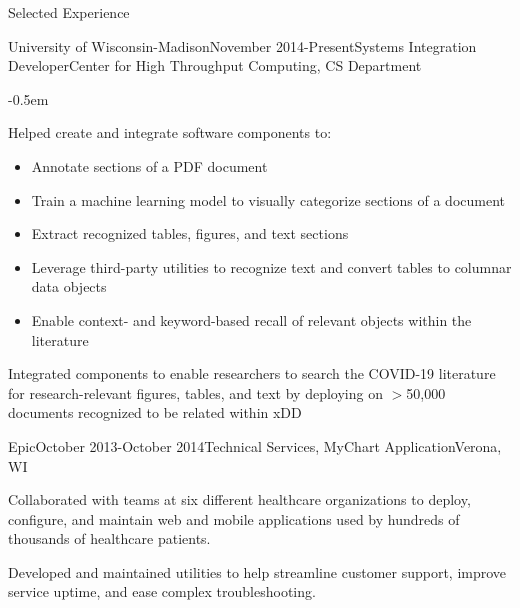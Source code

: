 \documentclass{resume} %
\begin{document}
\begin{rSection}{Selected Experience}
\begin{rSubsection}{University of Wisconsin-Madison}{November
    2014-Present}{Systems Integration Developer}{Center for High Throughput
    Computing, CS Department}
    \begin{list}{}{\leftmargin=1.5em} 
      \itemsep -0.5em \vspace{-0.5em} %
      \item Helped create and integrate software components to:
        \renewcommand\labelitemi{$\cdot$}
          \begin{itemize}{}{\leftmargin=1.25em}
          \item Annotate sections of a PDF document
          \item Train a machine learning model to visually categorize sections
              of a document
          \item Extract recognized tables, figures, and text sections
          \item Leverage third-party utilities to recognize text and convert tables
              to columnar data objects
          \item Enable context- and keyword-based recall of relevant objects
          within the literature
          \end{itemize}
      \item Integrated components to enable researchers to search the COVID-19 literature for
          research-relevant figures, tables, and text by deploying on
          $>$50,000 documents recognized to be related within xDD
    \end{list}
\end{rSubsection}

\begin{rSubsection}{Epic}{October 2013-October 2014}{Technical Services, MyChart
Application}{Verona, WI}
\item Collaborated with teams at six different healthcare organizations to
deploy, configure, and maintain web and mobile applications used by
hundreds of thousands of healthcare patients.
\item Developed and maintained utilities to help streamline customer support,
improve service uptime, and ease complex troubleshooting.
\end{rSubsection}


\end{rSection}
\end{document}
